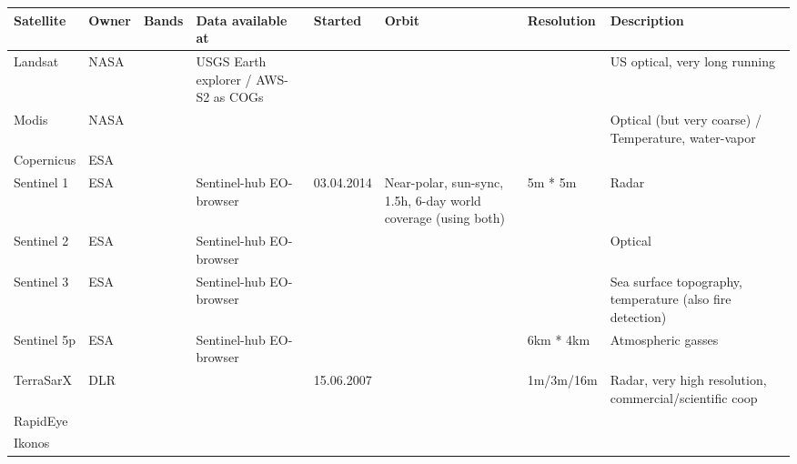 \begin{table}
    \centering
    \begin{tabular}{llllllll}
        \toprule
        Satellite   & Owner & Bands & Data available at                    & Started    & Orbit                                                         & Resolution & Description                                               \\
        \midrule
        Landsat     & NASA  &       & USGS Earth explorer / AWS-S2 as COGs &            &                                                               &            & US optical, very long running                             \\
        Modis       & NASA  &       &                                      &            &                                                               &            & Optical (but very coarse) / Temperature, water-vapor      \\
        Copernicus  & ESA   &       &                                      &            &                                                               &            &                                                           \\
        Sentinel 1  & ESA   &       & Sentinel-hub EO-browser              & 03.04.2014 & Near-polar, sun-sync, 1.5h, 6-day world coverage (using both) & 5m * 5m    & Radar                                                     \\
        Sentinel 2  & ESA   &       & Sentinel-hub EO-browser              &            &                                                               &            & Optical                                                   \\
        Sentinel 3  & ESA   &       & Sentinel-hub EO-browser              &            &                                                               &            & Sea surface topography, temperature (also fire detection) \\
        Sentinel 5p & ESA   &       & Sentinel-hub EO-browser              &            &                                                               & 6km * 4km  & Atmospheric gasses                                        \\
        TerraSarX   & DLR   &       &                                      & 15.06.2007 &                                                               & 1m/3m/16m  & Radar, very high resolution, commercial/scientific coop   \\
        RapidEye    &       &       &                                      &            &                                                               &            &                                                           \\
        Ikonos      &       &       &                                      &            &                                                               &            &                                                           \\
        \bottomrule
    \end{tabular}
\end{table}


